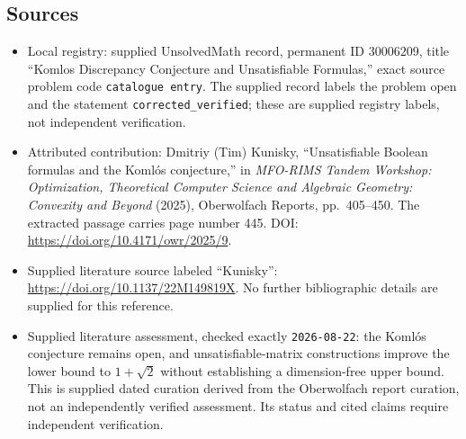 \documentclass[11pt]{article}
\begin{document}
\subsection{Sources}
\begin{itemize}
\item Local registry: supplied UnsolvedMath record, permanent ID \(30006209\), title ``Komlos Discrepancy Conjecture and Unsatisfiable Formulas,'' exact source problem code \texttt{catalogue entry}. The supplied record labels the problem open and the statement \texttt{corrected\_verified}; these are supplied registry labels, not independent verification.
\item Attributed contribution: Dmitriy (Tim) Kunisky, ``Unsatisfiable Boolean formulas and the Koml\'os conjecture,'' in \emph{MFO-RIMS Tandem Workshop: Optimization, Theoretical Computer Science and Algebraic Geometry: Convexity and Beyond} (2025), Oberwolfach Reports, pp.\ 405--450. The extracted passage carries page number 445. DOI: \url{https://doi.org/10.4171/owr/2025/9}.
\item Supplied literature source labeled ``Kunisky'': \url{https://doi.org/10.1137/22M149819X}. No further bibliographic details are supplied for this reference.
\item Supplied literature assessment, checked exactly \texttt{2026-08-22}: the Koml\'os conjecture remains open, and unsatisfiable-matrix constructions improve the lower bound to \(1+\sqrt{2}\) without establishing a dimension-free upper bound. This is supplied dated curation derived from the Oberwolfach report curation, not an independently verified assessment. Its status and cited claims require independent verification.
\end{itemize}
\end{document}
